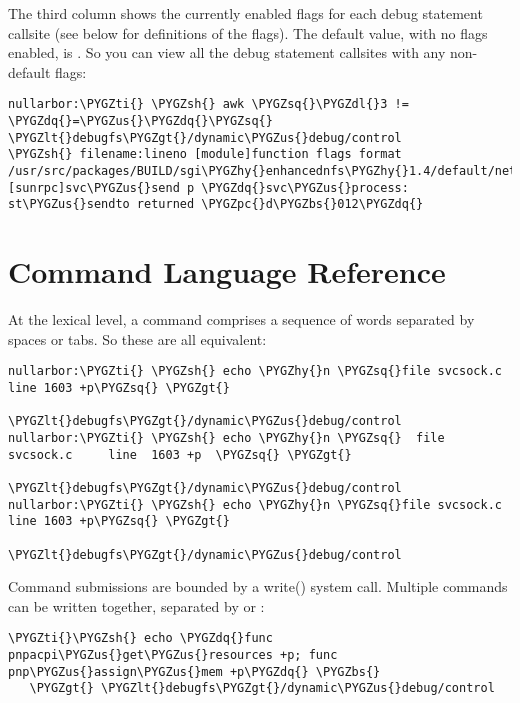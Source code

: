 \documentclass[a4paper,8pt,english]{sphinxmanual}
\def\PYGZbs{\char`\\}
\def\PYGZus{\char`\_}
\def\PYGZlt{\char`\<}
\def\PYGZgt{\char`\>}
\def\PYGZsh{\char`\#}
\def\PYGZpc{\char`\%}
\def\PYGZdl{\char`\$}
\def\PYGZhy{\char`\-}
\def\PYGZsq{\char`\'}
\def\PYGZdq{\char`\"}
\def\PYGZti{\char`\~}
\renewcommand\PYGZsq{\textquotesingle}
\begin{document}
The third column shows the currently enabled flags for each debug
statement callsite (see below for definitions of the flags).  The
default value, with no flags enabled, is \code{=\_}.  So you can view all
the debug statement callsites with any non-default flags:

\begin{Verbatim}[commandchars=\\\{\}]
nullarbor:\PYGZti{} \PYGZsh{} awk \PYGZsq{}\PYGZdl{}3 != \PYGZdq{}=\PYGZus{}\PYGZdq{}\PYGZsq{} \PYGZlt{}debugfs\PYGZgt{}/dynamic\PYGZus{}debug/control
\PYGZsh{} filename:lineno [module]function flags format
/usr/src/packages/BUILD/sgi\PYGZhy{}enhancednfs\PYGZhy{}1.4/default/net/sunrpc/svcsock.c:1603 [sunrpc]svc\PYGZus{}send p \PYGZdq{}svc\PYGZus{}process: st\PYGZus{}sendto returned \PYGZpc{}d\PYGZbs{}012\PYGZdq{}
\end{Verbatim}


\section{Command Language Reference}
\label{admin-guide/dynamic-debug-howto:command-language-reference}
At the lexical level, a command comprises a sequence of words separated
by spaces or tabs.  So these are all equivalent:

\begin{Verbatim}[commandchars=\\\{\}]
nullarbor:\PYGZti{} \PYGZsh{} echo \PYGZhy{}n \PYGZsq{}file svcsock.c line 1603 +p\PYGZsq{} \PYGZgt{}
                              \PYGZlt{}debugfs\PYGZgt{}/dynamic\PYGZus{}debug/control
nullarbor:\PYGZti{} \PYGZsh{} echo \PYGZhy{}n \PYGZsq{}  file   svcsock.c     line  1603 +p  \PYGZsq{} \PYGZgt{}
                              \PYGZlt{}debugfs\PYGZgt{}/dynamic\PYGZus{}debug/control
nullarbor:\PYGZti{} \PYGZsh{} echo \PYGZhy{}n \PYGZsq{}file svcsock.c line 1603 +p\PYGZsq{} \PYGZgt{}
                              \PYGZlt{}debugfs\PYGZgt{}/dynamic\PYGZus{}debug/control
\end{Verbatim}

Command submissions are bounded by a write() system call.
Multiple commands can be written together, separated by \code{;} or :

\begin{Verbatim}[commandchars=\\\{\}]
\PYGZti{}\PYGZsh{} echo \PYGZdq{}func pnpacpi\PYGZus{}get\PYGZus{}resources +p; func pnp\PYGZus{}assign\PYGZus{}mem +p\PYGZdq{} \PYGZbs{}
   \PYGZgt{} \PYGZlt{}debugfs\PYGZgt{}/dynamic\PYGZus{}debug/control
\end{Verbatim}
\end{document}
